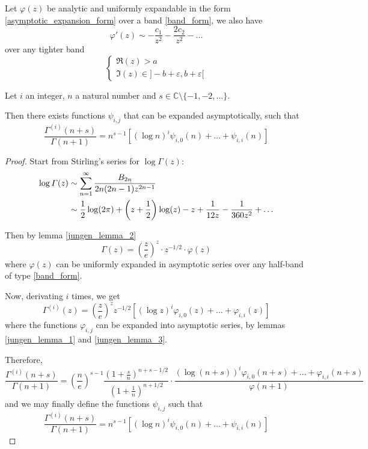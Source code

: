 \documentclass[../main.tex]{subfiles}
\begin{document}
\begin{lemma}{}\label{jungen_lemma_3}
	Let $\varphi(z)$ be analytic and uniformly expandable in the form \eqref{asymptotic_expansion_form} over a band \eqref{band_form}, we also have
	\[
	\varphi'(z) \sim -\frac{c_1}{z^2} - \frac{2c_2}{z^2} - \dots
	\]
	over any tighter band
	\begin{equation}
	\begin{cases}
	\Re(z) > a\\
	\Im(z) \in ]-b + \varepsilon, b + \varepsilon[
	\end{cases}
	\end{equation}
\end{lemma}

\begin{lemma}{}\label{lemma_quotient_gamma}
	Let $i$ an integer, $n$ a natural number and $s \in \mathbb{C} \setminus \{-1, -2, \dots\}$.

	Then there exists functions $\psi_{i, j}$ that can be expanded asymptotically, such that
	\begin{equation}
	\frac{\Gamma^{(i)}(n+s)}{\Gamma(n + 1)} = n^{s-1} [{(\log n)}^i \psi_{i, 0}(n) + \dots + \psi_{i, i}(n)]
	\end{equation}
\end{lemma}

\begin{proof}
	Start from Stirling's series for $\log \Gamma(z)$:
	\begin{align*}
	\log \Gamma(z) &\sim \sum\limits_{n=1}^\infty \frac{B_{2n}}{2n(2n-1)z^{2n-1}}\\
	&\sim \frac{1}{2} \log(2\pi) + \left(z + \frac{1}{2}\right) \log (z) - z + \frac{1}{12z} - \frac{1}{360z^2} + \dots
	\end{align*}
	
	Then by lemma \ref{jungen_lemma_2}
	\[
	\Gamma(z) = {\left(\frac{z}{e}\right)}^z \cdot z^{-1/2} \cdot \varphi(z)
	\]
	where $\varphi(z)$ can be uniformly expanded in asymptotic series over any half-band of type \eqref{band_form}.
	
	Now, derivating $i$ times, we get
	\begin{equation*}
	\Gamma^{(i)}(z) = {\left(\frac{z}{e}\right)}^z z^{-1/2}
	\left[{(\log z)}^i \varphi_{i,0}(z) + \dots + \varphi_{i,i}(z) \right]
	\end{equation*}
	where the functions $\varphi_{i,j}$ can be expanded into asymptotic series, by lemmas \ref{jungen_lemma_1} and \ref{jungen_lemma_3}.
	
	Therefore,
	\begin{equation*}
	\frac{\Gamma^{(i)}(n+s)}{\Gamma(n + 1)} =
	{\left(\frac{n}{e}\right)}^{s - 1} \frac{{\left(1 + \frac{s}{n}\right)}^{n + s - 1/2}}{{\left(1 + \frac{1}{n}\right)}^{n + 1/2}}
	\cdot \frac{{(\log(n + s))}^i \varphi_{i,0}(n+s) + \dots + \varphi_{i,i}(n+s)}{\varphi(n + 1)}
	\end{equation*}
	and we may finally define the functions $\psi_{i, j}$ such that
	\[
	\frac{\Gamma^{(i)}(n+s)}{\Gamma(n + 1)} = n^{s-1} [{(\log n)}^i \psi_{i, 0}(n) + \dots + \psi_{i, i}(n)]
	\]
\end{proof}
\end{document}
